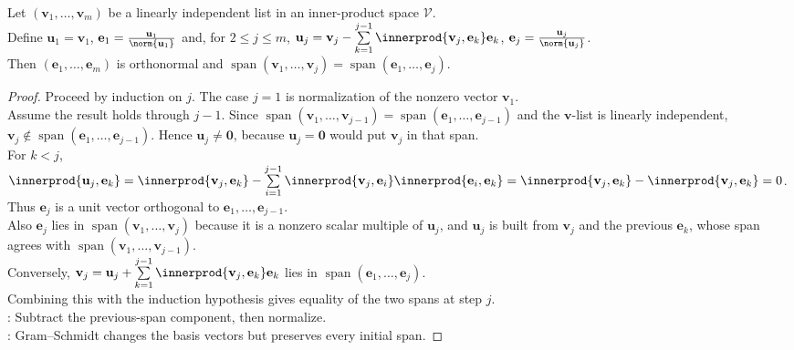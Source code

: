 \begin{theorem} \label{thm:gram-schmidt-process} \\
Let $(\mathbf{v}_1,\ldots,\mathbf{v}_m)$ be a linearly independent list in an inner-product space $\mathcal{V}$.\\
Define $\mathbf{u}_1=\mathbf{v}_1$, $\mathbf{e}_1=\frac{\mathbf{u}_1}{\norm{\mathbf{u}_1}}$ and, for $2\leq j\leq m$, $\mathbf{u}_j=\mathbf{v}_j-\sum\limits_{k=1}^{j-1}\innerprod{\mathbf{v}_j,\mathbf{e}_k}\mathbf{e}_k$, $\mathbf{e}_j=\frac{\mathbf{u}_j}{\norm{\mathbf{u}_j}}$.\\
Then $(\mathbf{e}_1,\ldots,\mathbf{e}_m)$ is orthonormal and $\operatorname{span}(\mathbf{v}_1,\ldots,\mathbf{v}_j)=\operatorname{span}(\mathbf{e}_1,\ldots,\mathbf{e}_j)$.
\begin{proof}
Proceed by induction on $j$. The case $j=1$ is normalization of the nonzero vector $\mathbf{v}_1$.\\
Assume the result holds through $j-1$. Since $\operatorname{span}(\mathbf{v}_1,\ldots,\mathbf{v}_{j-1})=\operatorname{span}(\mathbf{e}_1,\ldots,\mathbf{e}_{j-1})$ and the $\mathbf{v}$-list is linearly independent, $\mathbf{v}_j\notin\operatorname{span}(\mathbf{e}_1,\ldots,\mathbf{e}_{j-1})$. Hence $\mathbf{u}_j\neq\mathbf{0}$, because $\mathbf{u}_j=\mathbf{0}$ would put $\mathbf{v}_j$ in that span.\\
For $k<j$, $\innerprod{\mathbf{u}_j,\mathbf{e}_k} =\innerprod{\mathbf{v}_j,\mathbf{e}_k} -\sum\limits_{i=1}^{j-1}\innerprod{\mathbf{v}_j,\mathbf{e}_i}\innerprod{\mathbf{e}_i,\mathbf{e}_k} =\innerprod{\mathbf{v}_j,\mathbf{e}_k}-\innerprod{\mathbf{v}_j,\mathbf{e}_k}=0$.\\
Thus $\mathbf{e}_j$ is a unit vector orthogonal to $\mathbf{e}_1,\ldots,\mathbf{e}_{j-1}$.\\
Also $\mathbf{e}_j$ lies in $\operatorname{span}(\mathbf{v}_1,\ldots,\mathbf{v}_j)$ because it is a nonzero scalar multiple of $\mathbf{u}_j$, and $\mathbf{u}_j$ is built from $\mathbf{v}_j$ and the previous $\mathbf{e}_k$, whose span agrees with $\operatorname{span}(\mathbf{v}_1,\ldots,\mathbf{v}_{j-1})$.\\
Conversely, $\mathbf{v}_j=\mathbf{u}_j+\sum\limits_{k=1}^{j-1}\innerprod{\mathbf{v}_j,\mathbf{e}_k}\mathbf{e}_k$ lies in $\operatorname{span}(\mathbf{e}_1,\ldots,\mathbf{e}_j)$. \\
Combining this with the induction hypothesis gives equality of the two spans at step $j$.\\
: Subtract the previous-span component, then normalize.\\
: Gram--Schmidt changes the basis vectors but preserves every initial span.
\end{proof}
\end{theorem}

